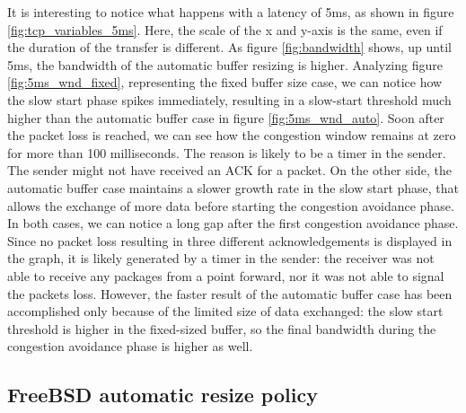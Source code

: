\documentclass[a4paper,10pt]{article}
\begin{document}
It is interesting to notice what happens with a latency of 5ms, as shown in figure \ref{fig:tcp_variables_5ms}. Here, the scale of the x and y-axis is the same, even if the duration of the transfer is different. As figure \ref{fig:bandwidth} shows, up until 5ms, the bandwidth of the automatic buffer resizing is higher. 
Analyzing figure \ref{fig:5ms_wnd_fixed}, representing the fixed buffer size case, we can notice how the slow start phase spikes immediately, resulting in a slow-start threshold much higher than the automatic buffer case in figure \ref{fig:5ms_wnd_auto}. Soon after the packet loss is reached, we can see how the congestion window remains at zero for more than 100 milliseconds. The reason is likely to be a timer in the sender. The sender might not have received an ACK for a packet.
On the other side, the automatic buffer case maintains a slower growth rate in the slow start phase, that allows the exchange of more data before starting the congestion avoidance phase. In both cases, we can notice a long gap after the first congestion avoidance phase. Since no packet loss resulting in three different acknowledgements is displayed in the graph, it is likely generated by a timer in the sender: the receiver was not able to receive any packages from a point forward, nor it was not able to signal the packets loss.
However, the faster result of the automatic buffer case has been accomplished only because of the limited size of data exchanged: the slow start threshold is higher in the fixed-sized buffer, so the final bandwidth during the congestion avoidance phase is higher as well.
\subsection{FreeBSD automatic resize policy}

\end{document}
